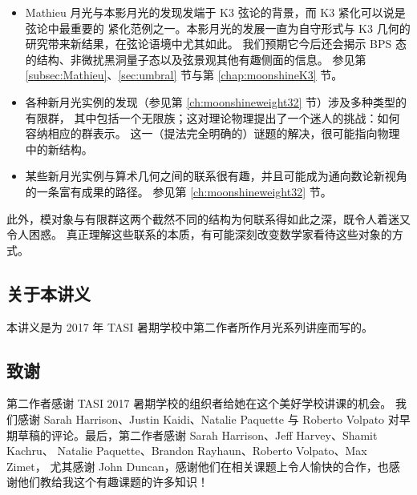 \documentclass[11pt,a4paper,fontset=windows]{ctexart}
\numberwithin{equation}{section}
\begin{document}
\begin{itemize}
\item  Mathieu 月光与本影月光的发现发端于 K3 弦论的背景，而 K3 紧化可以说是弦论中最重要的
       紧化范例之一。本影月光的发展一直为自守形式与 K3 几何的研究带来新结果，在弦论语境中尤其如此。
       我们预期它今后还会揭示 BPS 态的结构、非微扰黑洞量子态以及弦景观其他有趣侧面的信息。
       参见第 \ref{subsec:Mathieu}、\ref{sec:umbral} 节与第 \ref{chap:moonshineK3} 节。

\item  各种新月光实例的发现（参见第 \ref{ch:moonshineweight32} 节）涉及多种类型的有限群，
       其中包括一个无限族；这对理论物理提出了一个迷人的挑战：如何容纳相应的群表示。
       这一（提法完全明确的）谜题的解决，很可能指向物理中的新结构。

\item  某些新月光实例与算术几何之间的联系很有趣，并且可能成为通向数论新视角的一条富有成果的路径。
       参见第 \ref{ch:moonshineweight32} 节。
\end{itemize}

此外，模对象与有限群这两个截然不同的结构为何联系得如此之深，既令人着迷又令人困惑。
真正理解这些联系的本质，有可能深刻改变数学家看待这些对象的方式。


\subsection*{关于本讲义}

本讲义是为 2017 年 TASI 暑期学校中第二作者所作月光系列讲座而写的。

\subsection*{致谢}

第二作者感谢 TASI 2017 暑期学校的组织者给她在这个美好学校讲课的机会。
我们感谢 Sarah Harrison、Justin Kaidi、Natalie Paquette 与 Roberto Volpato
对早期草稿的评论。最后，第二作者感谢 Sarah Harrison、Jeff Harvey、Shamit Kachru、
Natalie Paquette、Brandon Rayhaun、Roberto Volpato、Max Zimet，
尤其感谢 John Duncan，感谢他们在相关课题上令人愉快的合作，也感谢他们教给我这个有趣课题的许多知识！
\end{document}
